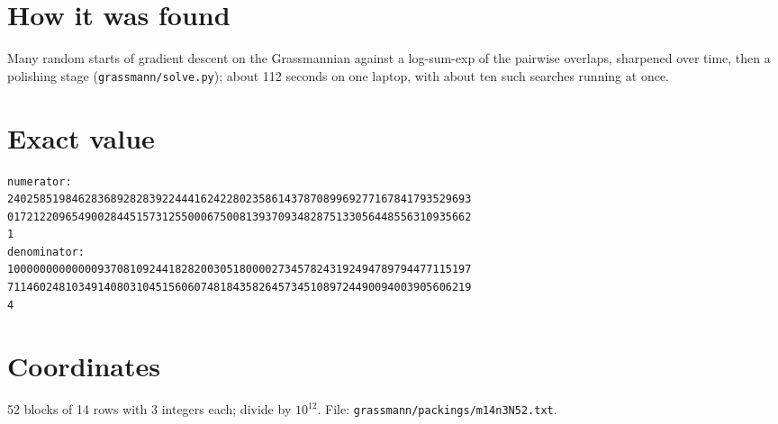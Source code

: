 \documentclass[11pt,a4paper]{article}
\begin{document}
\section{How it was found}
Many random starts of gradient descent on the Grassmannian against a log-sum-exp of the pairwise overlaps, sharpened over time, then a polishing stage (\texttt{grassmann/solve.py}); about 112 seconds on one laptop, with about ten such searches running at once.


\appendix
\section{Exact value}
{\small
\begin{verbatim}
numerator:
240258519846283689282839224441624228023586143787089969277167841793529693
017212209654900284451573125500067500813937093482875133056448556310935662
1
denominator:
100000000000009370810924418282003051800002734578243192494789794477115197
711460248103491408031045156060748184358264573451089724490094003905606219
4
\end{verbatim}}

\section{Coordinates}
52 blocks of 14 rows with 3 integers each; divide by $10^{12}$. File: \texttt{grassmann/packings/m14n3N52.txt}.
{\tiny
\begin{multicols}{3}
\end{multicols}}
\end{document}
